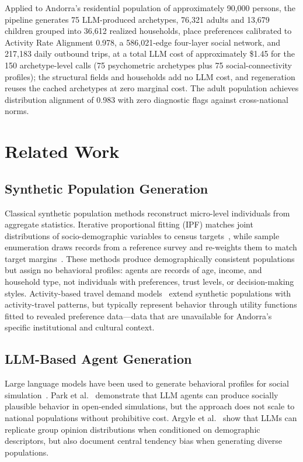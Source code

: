 \documentclass[a4paper,12pt]{article}
\begin{document}
Applied to Andorra's residential population of approximately 90,000 persons,
the pipeline generates 75 LLM-produced archetypes, 76{,}321 adults and 13{,}679
children grouped into 36{,}612 realized households, place preferences calibrated to
Activity Rate Alignment 0.978, a 586{,}021-edge four-layer social network, and
217{,}183 daily outbound trips, at a total LLM cost of approximately \$1.45 for the
150 archetype-level calls (75 psychometric archetypes plus 75 social-connectivity
profiles); the structural fields and households add no LLM cost, and regeneration
reuses the cached archetypes at zero marginal cost. The adult population achieves
distribution alignment of 0.983 with zero diagnostic flags against cross-national
norms.

\section{Related Work}
\label{sec:related_work}

\subsection{Synthetic Population Generation}

Classical synthetic population methods reconstruct micro-level individuals
from aggregate statistics. Iterative proportional fitting (IPF) matches
joint distributions of socio-demographic variables to census
targets~\cite{deming1940least}, while sample enumeration draws records from a
reference survey and re-weights them to match target
margins~\cite{muller2021synthetic}. These methods produce demographically
consistent populations but assign no behavioral profiles: agents are records
of age, income, and household type, not individuals with preferences,
trust levels, or decision-making styles. Activity-based travel demand
models~\cite{axhausen2016population,bhat1999activity} extend synthetic
populations with activity-travel patterns, but typically represent behavior
through utility functions fitted to revealed preference data---data that are
unavailable for Andorra's specific institutional and cultural context.

\subsection{LLM-Based Agent Generation}

Large language models have been used to generate behavioral profiles for
social simulation~\cite{park2023generative,argyle2023outstuffing,
adornetto2025generative,garcia2025simulating}. Park et al.~\cite{park2023generative}
demonstrate that LLM agents can produce socially plausible behavior in
open-ended simulations, but the approach does not scale to national populations
without prohibitive cost. Argyle et al.~\cite{argyle2023outstuffing} show
that LLMs can replicate group opinion distributions when conditioned on
demographic descriptors, but also document central tendency bias when
generating diverse populations.
\end{document}
